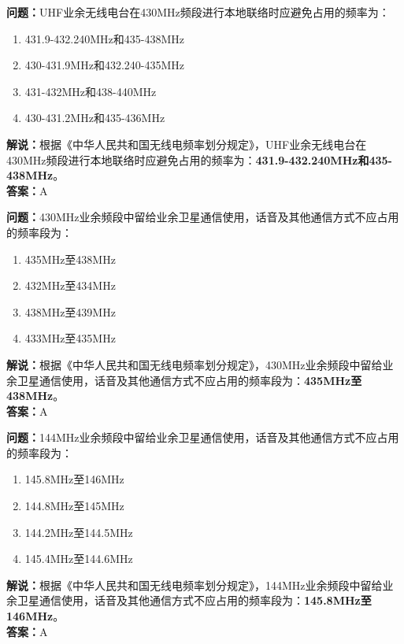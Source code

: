 \textbf{问题：}UHF业余无线电台在430MHz频段进行本地联络时应避免占用的频率为：
\begin{enumerate}[label=\Alph*), leftmargin=1cm]
  \item 431.9-432.240MHz和435-438MHz
  \item 430-431.9MHz和432.240-435MHz
  \item 431-432MHz和438-440MHz
  \item 430-431.2MHz和435-436MHz
\end{enumerate}
\textbf{解说：}根据《中华人民共和国无线电频率划分规定》，UHF业余无线电台在430MHz频段进行本地联络时应避免占用的频率为：\textbf{431.9-432.240MHz和435-438MHz}。\\\textbf{答案：}A%

\textbf{问题：}430MHz业余频段中留给业余卫星通信使用，话音及其他通信方式不应占用的频率段为：
\begin{enumerate}[label=\Alph*), leftmargin=1cm]
  \item 435MHz至438MHz
  \item 432MHz至434MHz
  \item 438MHz至439MHz
  \item 433MHz至435MHz
\end{enumerate}
\textbf{解说：}根据《中华人民共和国无线电频率划分规定》，430MHz业余频段中留给业余卫星通信使用，话音及其他通信方式不应占用的频率段为：\textbf{435MHz至438MHz}。\\\textbf{答案：}A

\textbf{问题：}144MHz业余频段中留给业余卫星通信使用，话音及其他通信方式不应占用的频率段为：
\begin{enumerate}[label=\Alph*), leftmargin=1cm]
  \item 145.8MHz至146MHz
  \item 144.8MHz至145MHz
  \item 144.2MHz至144.5MHz
  \item 145.4MHz至144.6MHz
\end{enumerate}
\textbf{解说：}根据《中华人民共和国无线电频率划分规定》，144MHz业余频段中留给业余卫星通信使用，话音及其他通信方式不应占用的频率段为：\textbf{145.8MHz至146MHz}。\\\textbf{答案：}A%

